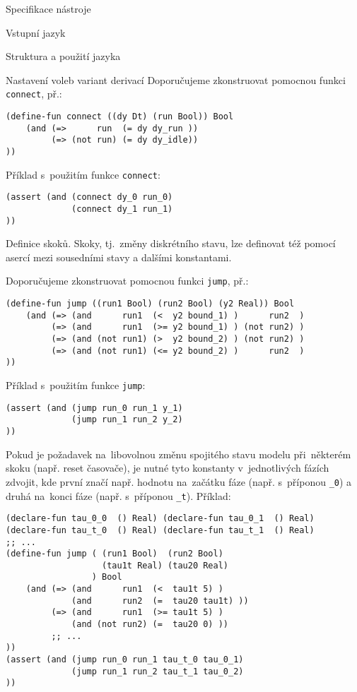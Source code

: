 \documentclass[thesis=M,czech]{FITthesis}[2012/06/26]
\newcommand{\id}[1]{\texttt{#1}}
\begin{document}
\begin{section}{Specifikace nástroje}
\begin{subsection}{Vstupní jazyk}
\begin{subsubsection}{Struktura a použití jazyka}
\begin{paragraph}{Nastavení voleb variant derivací}
Doporučujeme zkonstruovat pomocnou funkci \id{connect}, př.:
\begin{Verbatim}[samepage=true]
(define-fun connect ((dy Dt) (run Bool)) Bool
    (and (=>      run  (= dy dy_run ))
         (=> (not run) (= dy dy_idle))
))
\end{Verbatim}

Příklad s~použitím funkce \id{connect}:
\begin{Verbatim}[samepage=true]
(assert (and (connect dy_0 run_0)
             (connect dy_1 run_1)
))
\end{Verbatim}
\end{paragraph} %


\begin{paragraph}{Definice skoků.}\label{p:design:spec:ilang:struct:jump}
Skoky, tj.~změny diskrétního stavu,
lze definovat též pomocí asercí
mezi sousedními stavy a dalšími konstantami.

Doporučujeme zkonstruovat pomocnou funkci \id{jump}, př.:
\begin{Verbatim}[samepage=true]
(define-fun jump ((run1 Bool) (run2 Bool) (y2 Real)) Bool
    (and (=> (and      run1  (<  y2 bound_1) )      run2  )
         (=> (and      run1  (>= y2 bound_1) ) (not run2) )
         (=> (and (not run1) (>  y2 bound_2) ) (not run2) )
         (=> (and (not run1) (<= y2 bound_2) )      run2  )
))
\end{Verbatim}

Příklad s~použitím funkce \id{jump}:
\begin{Verbatim}[samepage=true]
(assert (and (jump run_0 run_1 y_1)
             (jump run_1 run_2 y_2)
))
\end{Verbatim}

Pokud je požadavek na~libovolnou změnu
spojitého stavu modelu při~některém skoku
(např. reset časovače),
je nutné tyto konstanty v~jednotlivých fázích zdvojit,
kde první značí např. hodnotu na~začátku fáze
(např. s~příponou \id{\_0})
a druhá na~konci fáze
(např. s~příponou \id{\_t}).
Příklad:
\begin{Verbatim}[samepage=true]
(declare-fun tau_0_0  () Real) (declare-fun tau_0_1  () Real)
(declare-fun tau_t_0  () Real) (declare-fun tau_t_1  () Real)
;; ...
(define-fun jump ( (run1 Bool)  (run2 Bool)
                   (tau1t Real) (tau20 Real)
                 ) Bool
    (and (=> (and      run1  (<  tau1t 5) )
             (and      run2  (=  tau20 tau1t) ))
         (=> (and      run1  (>= tau1t 5) )
             (and (not run2) (=  tau20 0) ))
         ;; ...
))
(assert (and (jump run_0 run_1 tau_t_0 tau_0_1)
             (jump run_1 run_2 tau_t_1 tau_0_2)
))
\end{Verbatim}
\end{paragraph} %


\end{subsubsection}
\end{subsection}
\end{section}
\end{document}
